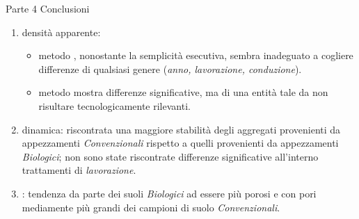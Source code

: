 \documentclass[10pt]{beamer}
\begin{document}
\begin{frame}[label=finale]{Parte 4 \small{Conclusioni}}
  \begin{enumerate}[<+->]

  \item densità apparente:
    \begin{itemize}
    \item metodo \hyperlink{Core}{}, nonostante la semplicità esecutiva,
      sembra inadeguato a cogliere differenze di qualsiasi genere
      (\emph{anno, lavorazione, conduzione}).
    \item metodo \hyperlink{Clod}{} mostra differenze significative, ma di
      una entità tale da non risultare tecnologicamente rilevanti.
    \end{itemize}
  \item \hyperlink{distribuzione}{} dinamica: riscontrata una
    maggiore stabilità degli aggregati provenienti da appezzamenti
    \emph{Convenzionali} rispetto a quelli provenienti da appezzamenti
    \emph{Biologici}; non sono state riscontrate differenze significative
    all'interno trattamenti di \emph{lavorazione}.
  \item \hyperlink{Porosimetria}{}: tendenza da parte dei suoli
    \emph{Biologici} ad essere più porosi e con pori mediamente più
    grandi dei campioni di suolo \emph{Convenzionali}.
  \end{enumerate}

\end{frame}
\end{document}
